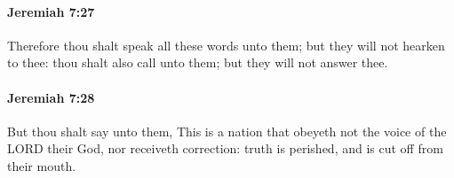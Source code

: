 		\paragraph{Jeremiah 7:27} %
			\label{JEREMIAH-7-27}

			Therefore thou shalt speak all these words unto them; but they will not hearken to thee: thou shalt also call unto them; but they will not answer thee.


		\paragraph{Jeremiah 7:28} %
			\label{JEREMIAH-7-28}

			But thou shalt say unto them, This is a nation that obeyeth not the voice of the LORD their God, nor receiveth correction: truth is perished, and is cut off from their mouth.


